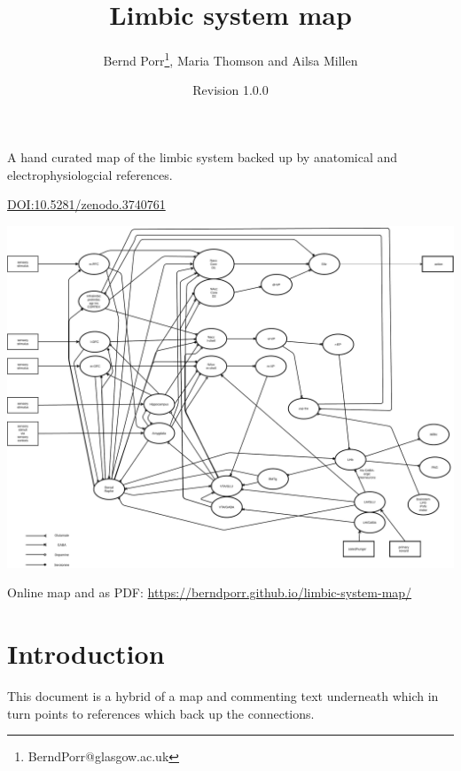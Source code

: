 \documentclass[12pt,a4paper]{article}
\title{Limbic system map}
\author{Bernd Porr\footnote{BerndPorr@glasgow.ac.uk}, Maria Thomson and Ailsa Millen}
\date{Revision 1.0.0}
\begin{document}
\maketitle

\begin{center}
  A hand curated map of the limbic system backed up by anatomical and
  electrophysiologcial references.
\end{center}
\begin{center}
  \href{https://doi.org/10.5281/zenodo.3740761}{DOI:10.5281/zenodo.3740761}
\end{center}
\begin{latexonly}
  \begin{center}
    \includegraphics[width=\textwidth]{limbic-map}
  \end{center}
  {\footnotesize Online map and as PDF: \url{https://berndporr.github.io/limbic-system-map/}}
\end{latexonly}


\clearpage

\tableofcontents

\section{Introduction}
This document is a hybrid of a map and commenting text
underneath which in turn points to references which back up the
connections.
\end{document}
